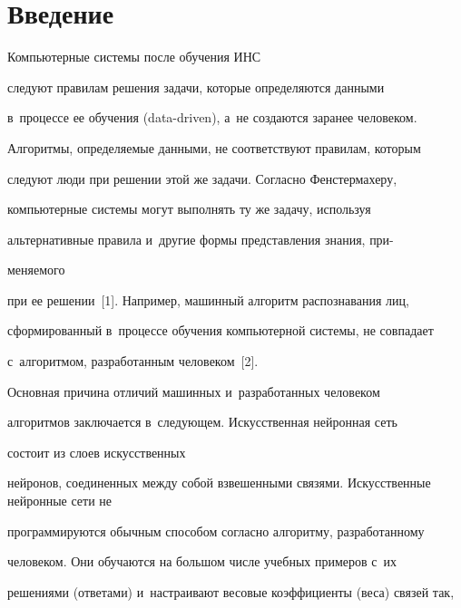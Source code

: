 \section{Введение}


   


   Компьютерные системы после обучения ИНС


    следуют правилам решения задачи, которые определяются данными 


в~процессе ее обучения (data-driven), а~не создаются заранее человеком. 


Алгоритмы, определяемые данными, не соответствуют правилам, которым 


следуют люди при решении этой же задачи. Согласно Фенстермахеру, 


компьютерные системы могут выполнять ту же задачу, используя 


альтернативные правила и~другие формы представления знания, при-\linebreak


\vspace*{-12pt}





\pagebreak





\noindent


меняемого 


при ее решении~[1]. Например, машинный алгоритм распознавания лиц, 


сформированный в~процессе обучения компьютерной системы, не совпадает 


с~алгоритмом, разработанным человеком~[2].


   


   Основная причина отличий машинных и~разработанных человеком 


алгоритмов заключается в~следующем. Искусственная нейронная сеть


 состоит из слоев искусственных 


нейронов, соединенных между собой взвешенными связями. Искусственные нейронные сети не 


программируются обычным способом согласно алгоритму, разработанному 


человеком. Они обучаются на большом числе учебных примеров с~их 


решениями (ответами) и~настраивают весовые коэффициенты (веса) связей так, 


